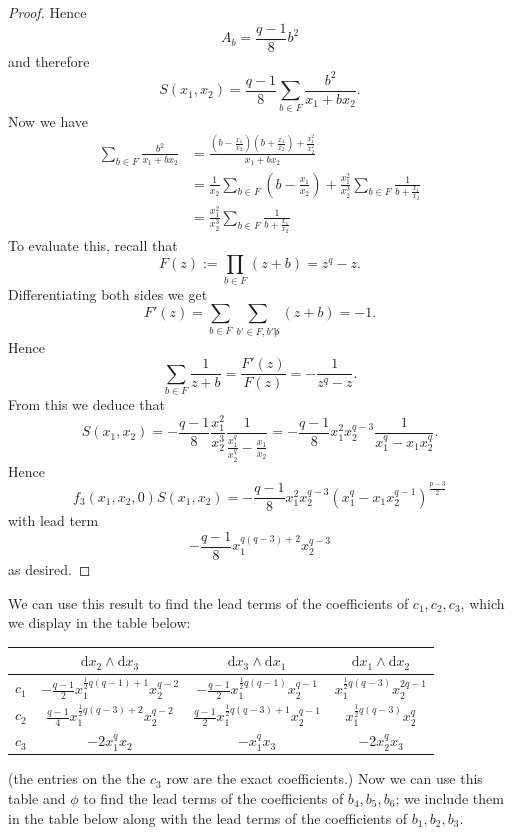 \documentclass[a4paper]{amsart}
\newcommand{\dd}{\mathrm{d}}
\newtheorem*{Corollary of Conjecture}{Corollary of Conjecture}
\theoremstyle{definition}
\theoremstyle{remark}
\theoremstyle{Acknowledgments}
\begin{document}
\begin{proof}
Hence
\[A_b =\frac{q-1}{8} b^2\]
and therefore
\[S(x_1,x_2) = \frac{q-1}{8} \sum_{b \in F} \frac{b^2}{x_1+bx_2}.\]
Now we have
\begin{align*}
\sum_{b \in F} \frac{b^2}{x_1+bx_2} &= \frac{(b-\frac{x_1}{x_2})(b+\frac{x_1}{x_2})+ \frac{x_1^2}{x_2^2}}{x_1+bx_2}\\
&= \frac{1}{x_2} \sum_{b \in F} (b-\frac{x_1}{x_2}) + \frac{x_1^2}{x_2^3} \sum_{b \in F} \frac{1}{b+ \frac{x_1}{x_2}}\\
&= \frac{x_1^2}{x_2^3} \sum_{b \in F} \frac{1}{b+ \frac{x_1}{x_2}}  \end{align*}
To evaluate this, recall that 
\[F(z):= \prod_{b \in F} (z+b) = z^q-z.\]
Differentiating both sides we get
\[F'(z) = \sum_{b \in F} \sum_{b' \in F, b' \not b} (z+b) = -1.\]
Hence
\[\sum_{b \in F} \frac{1}{z+b} = \frac{F'(z)}{F(z)} = -\frac{1}{z^q-z}.\]
From this we deduce that
\[S(x_1,x_2) = -\frac{q-1}{8}\frac{x_1^2}{x_2^3} \frac{1}{\frac{x_1^q}{x_2^q}-\frac{x_1}{x_2}} =  - \frac{q-1}{8}x_1^2x_2^{q-3} \frac{1}{x_1^q-x_1x_2^q}.\]
Hence
\[f_3(x_1,x_2,0)S(x_1,x_2) = -\frac{q-1}{8} x_1^2 x_2^{q-3} (x_1^q-x_1x_2^{q-1})^{\frac{p-3}{2}}\]
with lead term
\[-\frac{q-1}{8} x_1^{q(q-3)+2}x_2^{q-3}\]
as desired.
\end{proof}

We can use this result to find the lead terms of the coefficients of $c_1,c_2, c_3$, which we display in the table below:

\vspace{1cm}
\begin{tabular}{|c||c|c|c|} \hline
 & $\dd x_2 \wedge \dd x_3$ &  $\dd x_3 \wedge \dd x_1$ &  $\dd x_1 \wedge \dd x_2$ \\ \hline \hline
$c_1$ & $-\frac{q-1}{2}x_1^{\frac{1}{2}q(q-1)+1}x_2^{q-2}$ & $ -\frac{q-1}{2}x_1^{\frac{1}{2}q(q-1)}x_2^{q-1}$ &  $x_1^{\frac{1}{2}q(q-3)}x_2^{2q-1}$\\ \hline
$c_2$ & $\frac{q-1}{4} x_1^{\frac12 q(q-3)+2}x_2^{q-2}$ & $\frac{q-1}{2} x_1^{\frac12 q(q-3)+1}x_2^{q-1}$ &  $x_1^{\frac12 q(q-3)}x_2^{q}$\\  \hline
 $c_3$ & $ -2x_1^qx_2$ & $-x_1^qx_3$ & $-2x_2^qx_3$ \\ \hline
\end{tabular}
\vspace{1cm}


(the entries on the the $c_3$ row are the exact coefficients.) Now we can use this table and $\phi$ to find the lead terms of the coefficients of $b_4,b_5,b_6$; we include them in the table below along with the lead terms of the coefficients of $b_1,b_2,b_3$.
\end{document}
